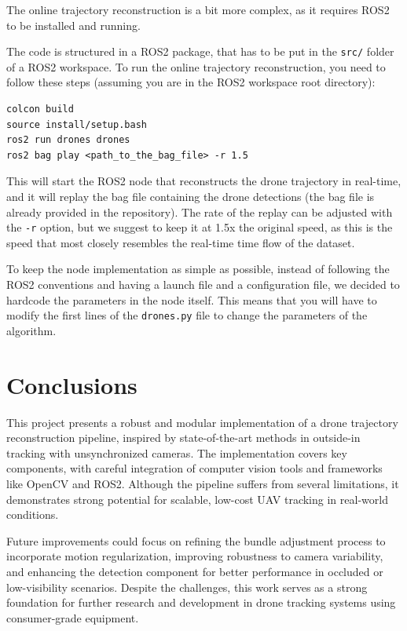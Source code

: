 \documentclass[11pt]{article}
\begin{document}
The online trajectory reconstruction is a bit more complex, as it requires ROS2 to be installed and running.

The code is structured in a ROS2 package, that has to be put in the \texttt{src/} folder of a ROS2 workspace. To run the online trajectory reconstruction, you need to follow these steps (assuming you are in the ROS2 workspace root directory):

\begin{verbatim}
colcon build
source install/setup.bash
ros2 run drones drones
ros2 bag play <path_to_the_bag_file> -r 1.5
\end{verbatim}

This will start the ROS2 node that reconstructs the drone trajectory in real-time, and it will replay the bag file containing the drone detections (the bag file is already provided in the repository). The rate of the replay can be adjusted with the \texttt{-r} option, but we suggest to keep it at 1.5x the original speed, as this is the speed that most closely resembles the real-time time flow of the dataset.

To keep the node implementation as simple as possible, instead of following the ROS2 conventions and having a launch file and a configuration file, we decided to hardcode the parameters in the node itself. This means that you will have to modify the first lines of the \texttt{drones.py} file to change the parameters of the algorithm.

\section{Conclusions}

This project presents a robust and modular implementation of a drone trajectory reconstruction pipeline, inspired by state-of-the-art methods in outside-in tracking with unsynchronized cameras. The implementation covers key components, with careful integration of computer vision tools and frameworks like OpenCV and ROS2. Although the pipeline suffers from several limitations, it demonstrates strong potential for scalable, low-cost UAV tracking in real-world conditions.

Future improvements could focus on refining the bundle adjustment process to incorporate motion regularization, improving robustness to camera variability, and enhancing the detection component for better performance in occluded or low-visibility scenarios. Despite the challenges, this work serves as a strong foundation for further research and development in drone tracking systems using consumer-grade equipment.
\end{document}
